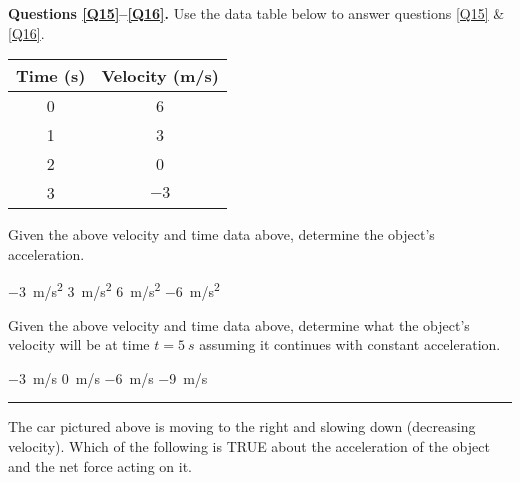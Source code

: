 \documentclass[answers]{exam}
\begin{document}
\begin{questions}
\begin{EnvUplevel}
    \textbf{Questions \ref{Q15}--\ref{Q16}.} Use the data table below to answer questions \ref{Q15} \& \ref{Q16}.
\end{EnvUplevel}

\begin{center}
    \begin{tabular}{|c|c|}
        \hline
        Time (s) & Velocity (m/s) \\ \hline
        0 & 6\\ \hline
        1 & 3\\ \hline
        2 & 0\\ \hline
        3 & $-3$ \\ \hline
    \end{tabular}
\end{center}

\question \label{Q15}
Given the above velocity and time data above, determine the object’s acceleration.

\begin{randomizeoneparchoices}
    \correctchoice \SI{-3}{m/s^2}
    \choice \SI{3}{m/s^2}
    \choice \SI{6}{m/s^2}
    \choice \SI{-6}{m/s^2}    
\end{randomizeoneparchoices}


\question \label{Q16}
Given the above velocity and time data above, determine what the object’s velocity will be at time $t = \SI{5}{s}$ assuming it continues with constant acceleration.

\begin{randomizeoneparchoices}
    \choice \SI{-3}{m/s}
    \choice \SI{0}{m/s}
    \choice \SI{-6}{m/s}
    \correctchoice \SI{-9}{m/s}   
\end{randomizeoneparchoices}

\bigskip
\hrule
\clearpage

\question
\phantom{.}

\begin{center}
\end{center}

The car pictured above is moving to the right and slowing down (decreasing velocity). Which of the following is TRUE about the acceleration of the object and the net force acting on it.


\end{questions}
\end{document}
